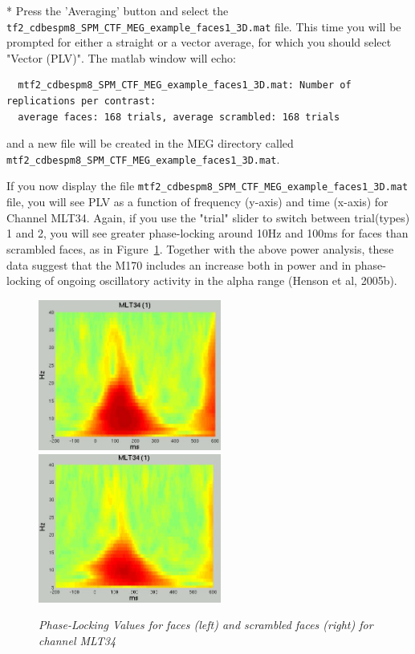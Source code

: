 * Press the 'Averaging' button and select the \verb!tf2_cdbespm8_SPM_CTF_MEG_example_faces1_3D.mat! file. This time you will be prompted for either a straight or a vector average, for which you should select "Vector (PLV)". The matlab window will echo:
\begin{verbatim}
  mtf2_cdbespm8_SPM_CTF_MEG_example_faces1_3D.mat: Number of replications per contrast:
  average faces: 168 trials, average scrambled: 168 trials
\end{verbatim}
    
and a new file will be created in the MEG directory called \verb!mtf2_cdbespm8_SPM_CTF_MEG_example_faces1_3D.mat!.

If you now display the file \verb!mtf2_cdbespm8_SPM_CTF_MEG_example_faces1_3D.mat! file, you will see PLV as a function of frequency (y-axis) and time (x-axis) for Channel MLT34. Again, if you use the "trial" slider to switch between trial(types) 1 and 2, you will see greater phase-locking around 10Hz and 100ms for faces than scrambled faces, as in Figure~\ref{fig_32_14}. Together with the above power analysis, these data suggest that the M170 includes an increase both in power and in phase-locking of ongoing oscillatory activity in the alpha range (Henson et al, 2005b).


\begin{figure}
\begin{center}
\includegraphics[width=60mm]{multimodal/figures/figure_32_14_L}
\includegraphics[width=60mm]{multimodal/figures/figure_32_14_R}
\caption{\em Phase-Locking Values for faces (left) and scrambled faces (right) for channel MLT34 \label{fig_32_14}}
\end{center}
\end{figure}

